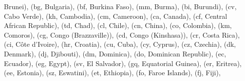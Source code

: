 \documentclass[letterpaper,10pt,english]{sphinxmanual}
\begin{document}
\begin{fulllineitems}
\begin{fulllineitems}
\textquotesingle{}Brunei\textquotesingle{}), (\textquotesingle{}bg\textquotesingle{}, \textquotesingle{}Bulgaria\textquotesingle{}), (\textquotesingle{}bf\textquotesingle{}, \textquotesingle{}Burkina Faso\textquotesingle{}), (\textquotesingle{}mm\textquotesingle{}, \textquotesingle{}Burma\textquotesingle{}), (\textquotesingle{}bi\textquotesingle{}, \textquotesingle{}Burundi\textquotesingle{}), (\textquotesingle{}cv\textquotesingle{}, \textquotesingle{}Cabo Verde\textquotesingle{}), (\textquotesingle{}kh\textquotesingle{}, \textquotesingle{}Cambodia\textquotesingle{}), (\textquotesingle{}cm\textquotesingle{}, \textquotesingle{}Cameroon\textquotesingle{}), (\textquotesingle{}ca\textquotesingle{}, \textquotesingle{}Canada\textquotesingle{}), (\textquotesingle{}cf\textquotesingle{}, \textquotesingle{}Central African Republic\textquotesingle{}), (\textquotesingle{}td\textquotesingle{}, \textquotesingle{}Chad\textquotesingle{}), (\textquotesingle{}cl\textquotesingle{}, \textquotesingle{}Chile\textquotesingle{}), (\textquotesingle{}cn\textquotesingle{}, \textquotesingle{}China\textquotesingle{}), (\textquotesingle{}co\textquotesingle{}, \textquotesingle{}Colombia\textquotesingle{}), (\textquotesingle{}km\textquotesingle{}, \textquotesingle{}Comoros\textquotesingle{}), (\textquotesingle{}cg\textquotesingle{}, \textquotesingle{}Congo (Brazzaville)\textquotesingle{}), (\textquotesingle{}cd\textquotesingle{}, \textquotesingle{}Congo (Kinshasa)\textquotesingle{}), (\textquotesingle{}cr\textquotesingle{}, \textquotesingle{}Costa Rica\textquotesingle{}), (\textquotesingle{}ci\textquotesingle{}, \textquotesingle{}Côte d’Ivoire\textquotesingle{}), (\textquotesingle{}hr\textquotesingle{}, \textquotesingle{}Croatia\textquotesingle{}), (\textquotesingle{}cu\textquotesingle{}, \textquotesingle{}Cuba\textquotesingle{}), (\textquotesingle{}cy\textquotesingle{}, \textquotesingle{}Cyprus\textquotesingle{}), (\textquotesingle{}cz\textquotesingle{}, \textquotesingle{}Czechia\textquotesingle{}), (\textquotesingle{}dk\textquotesingle{}, \textquotesingle{}Denmark\textquotesingle{}), (\textquotesingle{}dj\textquotesingle{}, \textquotesingle{}Djibouti\textquotesingle{}), (\textquotesingle{}dm\textquotesingle{}, \textquotesingle{}Dominica\textquotesingle{}), (\textquotesingle{}do\textquotesingle{}, \textquotesingle{}Dominican Republic\textquotesingle{}), (\textquotesingle{}ec\textquotesingle{}, \textquotesingle{}Ecuador\textquotesingle{}), (\textquotesingle{}eg\textquotesingle{}, \textquotesingle{}Egypt\textquotesingle{}), (\textquotesingle{}sv\textquotesingle{}, \textquotesingle{}El Salvador\textquotesingle{}), (\textquotesingle{}gq\textquotesingle{}, \textquotesingle{}Equatorial Guinea\textquotesingle{}), (\textquotesingle{}er\textquotesingle{}, \textquotesingle{}Eritrea\textquotesingle{}), (\textquotesingle{}ee\textquotesingle{}, \textquotesingle{}Estonia\textquotesingle{}), (\textquotesingle{}sz\textquotesingle{}, \textquotesingle{}Eswatini\textquotesingle{}), (\textquotesingle{}et\textquotesingle{}, \textquotesingle{}Ethiopia\textquotesingle{}), (\textquotesingle{}fo\textquotesingle{}, \textquotesingle{}Faroe Islands\textquotesingle{}), (\textquotesingle{}fj\textquotesingle{}, \textquotesingle{}Fiji\textquotesingle{}), 
\end{fulllineitems}
\end{fulllineitems}
\end{document}
